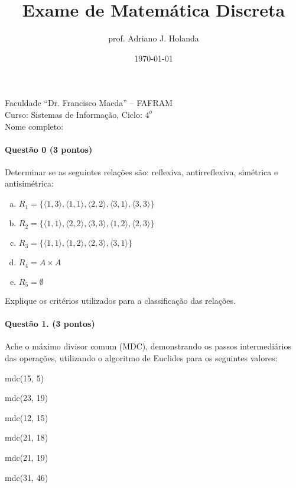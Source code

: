 \documentclass[11pt, a4paper]{article}
\title{Exame de Matemática Discreta}
\author{prof. Adriano J. Holanda}
\date{\today}
\def\tupla#1{\langle #1 \rangle}
\begin{document}
\maketitle

\noindent Faculdade ``Dr. Francisco Maeda'' -- FAFRAM\\
\noindent Curso: Sistemas de Informação, Ciclo: $4^o$\\
\noindent Nome completo:

\paragraph{Questão 0 (3 pontos)} Determinar se as seguintes relações
são: reflexiva, antirreflexiva, simétrica e antisimétrica:

\begin{enumerate}[(a)]
\item
$R_1=\{\tupla{1,3},\tupla{1,1},\tupla{2,2},\tupla{3,1},\tupla{3,3}\}$
\item
$R_2=\{\tupla{1,1},\tupla{2,2},\tupla{3,3},\tupla{1,2},\tupla{2,3}\}$
\item $R_3=\{\tupla{1,1},\tupla{1,2},\tupla{2,3},\tupla{3,1}\}$
\item $R_4 = A\times A$
\item $R_5 = \emptyset$
\end{enumerate}

\noindent Explique os critérios utilizados para a classificação das relações.

\paragraph{Questão 1. (3 pontos)} Ache o máximo divisor comum (MDC), demonstrando os passos
intermediários das operações, utilizando o algoritmo de Euclides para
os seguintes valores:

\begin{enumerate}[(a)]
\begin{minipage}{.5\textwidth}
\item mdc(15, 5)
\item mdc(23, 19)
\item mdc(12, 15)
\end{minipage}
\begin{minipage}{.5\textwidth}
\item mdc(21, 18)
\item mdc(21, 19)
\item mdc(31, 46)
\end{minipage}
\end{enumerate}
\end{document}
